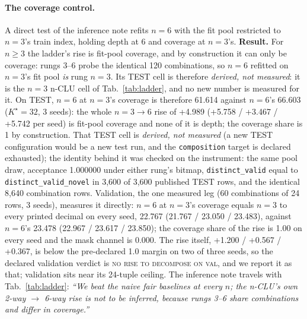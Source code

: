 \documentclass{article} %
\newcommand{\Kstar}{\ensuremath{K^{\star}}}
\begin{document}
\paragraph{The coverage control.} A direct test of the inference note refits $n=6$ with the
fit pool restricted to $n=3$'s train index, holding depth at 6 and coverage at $n=3$'s.
\textbf{Result.} For $n\ge3$ the ladder's rise is fit-pool
coverage, and by construction it can only be coverage: rungs 3--6 probe the identical 120 combinations, %
so $n=6$ refitted on $n=3$'s fit pool \emph{is} rung $n=3$. Its TEST cell is therefore
\emph{derived, not measured}: it is the $n=3$ n-CLU cell of Tab.~\ref{tab:ladder}, and no new
number is measured for it. %
On TEST, $n=6$ at $n=3$'s coverage is therefore 61.614 against $n=6$'s 66.603 ($\Kstar=32$, 3 seeds): %
the whole $n=3\to6$ rise of +4.989 (+5.758 / +3.467 / +5.742 per seed) is fit-pool coverage and %
none of it is depth; the coverage share is 1 by construction. That TEST cell is \emph{derived, not
measured} (a new TEST configuration would be a new test run, and the \texttt{composition} target is
declared exhausted); the identity behind it was checked on the instrument: the same pool draw,
acceptance 1.000000 under either rung's bitmap, \texttt{distinct\_valid} equal to %
\texttt{distinct\_valid\_novel} in 3,600 of 3,600 published TEST rows, and the identical 8,640 %
combination rows. Validation, the one measured leg (60 combinations of 24 rows, 3 seeds), measures it %
directly: $n=6$ at $n=3$'s coverage equals $n=3$ to every printed decimal on every seed, 22.767 %
(21.767 / 23.050 / 23.483), against $n=6$'s 23.478 (22.967 / 23.617 / 23.850); the coverage %
share of the rise is 1.00 on every seed and the mask channel is 0.000. The rise itself, %
+1.200 / +0.567 / +0.367, is below the pre-declared 1.0 margin on two of three seeds, so the %
declared validation verdict is \textsc{no rise to decompose on val}, and we report it as
that; validation sits near its 24-tuple ceiling. The inference note travels with %
Tab.~\ref{tab:ladder}: \emph{``We beat the naive fair baselines at every $n$; the n-CLU's own 2-way
$\to$ 6-way rise is not to be inferred, because rungs 3--6 share combinations and differ in coverage.''}
\end{document}
